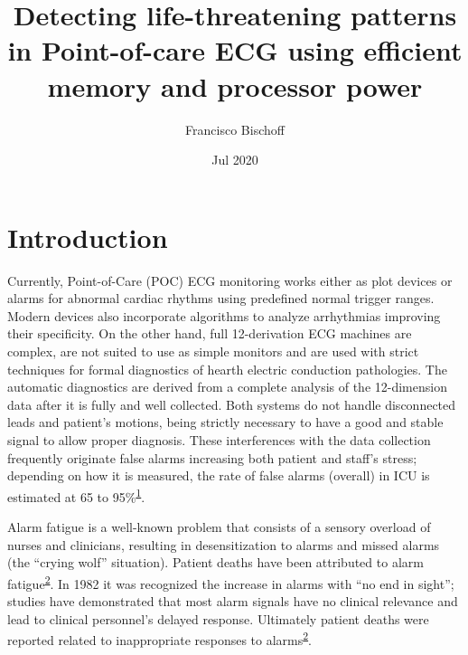 \documentclass[12pt,twoside]{fmupthesis}
\title{Detecting life-threatening patterns in Point-of-care ECG using efficient memory and processor power}
\author{Francisco Bischoff}
\date{Jul 2020}
\begin{document}
\maketitle

\frontmatter %
\pagestyle{empty} %



\hypersetup{linkcolor=black}
\setcounter{secnumdepth}{2}
\setcounter{tocdepth}{2}
\tableofcontents

\listoftables

\listoffigures



\mainmatter %
\pagestyle{fancyplain} %

\hypertarget{introduction}{%
\chapter*{Introduction}\label{introduction}}

Currently, Point-of-Care (POC) ECG monitoring works either as plot devices or alarms for abnormal cardiac rhythms using
predefined normal trigger ranges. Modern devices also incorporate algorithms to analyze arrhythmias improving their
specificity. On the other hand, full 12-derivation ECG machines are complex, are not suited to use as simple monitors
and are used with strict techniques for formal diagnostics of hearth electric conduction pathologies. The automatic
diagnostics are derived from a complete analysis of the 12-dimension data after it is fully and well collected. Both
systems do not handle disconnected leads and patient's motions, being strictly necessary to have a good and stable
signal to allow proper diagnosis. These interferences with the data collection frequently originate false alarms
increasing both patient and staff's stress; depending on how it is measured, the rate of false alarms (overall) in ICU
is estimated at 65 to 95\%\textsuperscript{\protect\hyperlink{ref-donchin2002}{1}}.

Alarm fatigue is a well-known problem that consists of a sensory overload of nurses and clinicians, resulting in
desensitization to alarms and missed alarms (the ``crying wolf'' situation). Patient deaths have been attributed to alarm
fatigue\textsuperscript{\protect\hyperlink{ref-sendelbach2013}{2}}. In 1982 it was recognized the increase in alarms with ``no end in sight''; studies have
demonstrated that most alarm signals have no clinical relevance and lead to clinical personnel's delayed response.
Ultimately patient deaths were reported related to inappropriate responses to alarms\textsuperscript{\protect\hyperlink{ref-sendelbach2013}{2}}.
\end{document}
